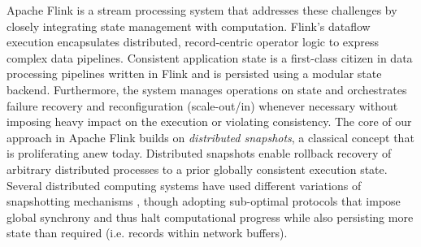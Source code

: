 Apache Flink \cite{carbone2015apache,CUSTOM:web/Flink} is a stream processing system that addresses these challenges by closely integrating state management with computation. Flink's dataflow execution encapsulates distributed, record-centric operator logic to express complex data pipelines. Consistent application state is a first-class citizen in data processing pipelines written in Flink and is persisted using a modular state backend. Furthermore, the system manages operations on state and orchestrates failure recovery and reconfiguration (scale-out/in) whenever necessary without imposing heavy impact on the execution or violating consistency. 
The core of our approach in Apache Flink builds on \emph{distributed snapshots}, a  classical concept that is proliferating anew today. Distributed snapshots enable rollback recovery of arbitrary distributed processes \cite{elnozahy2002survey} to a prior globally consistent execution state. Several distributed computing systems have used different variations of snapshotting mechanisms \cite{murray2013naiad,low2012distributed}, though adopting sub-optimal protocols that impose global synchrony and thus halt computational progress while also persisting more state than required (i.e. records within network buffers).



